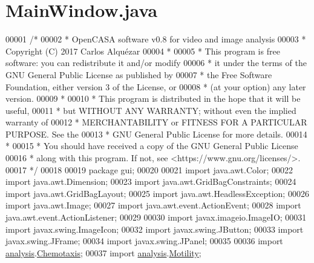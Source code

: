 \hypertarget{_main_window_8java_source}{}\section{Main\+Window.\+java}
\label{_main_window_8java_source}

\begin{DoxyCode}
00001 \textcolor{comment}{/*}
00002 \textcolor{comment}{ *   OpenCASA software v0.8 for video and image analysis}
00003 \textcolor{comment}{ *   Copyright (C) 2017  Carlos Alquézar}
00004 \textcolor{comment}{ *}
00005 \textcolor{comment}{ *   This program is free software: you can redistribute it and/or modify}
00006 \textcolor{comment}{ *   it under the terms of the GNU General Public License as published by}
00007 \textcolor{comment}{ *   the Free Software Foundation, either version 3 of the License, or}
00008 \textcolor{comment}{ *   (at your option) any later version.}
00009 \textcolor{comment}{ *}
00010 \textcolor{comment}{ *   This program is distributed in the hope that it will be useful,}
00011 \textcolor{comment}{ *   but WITHOUT ANY WARRANTY; without even the implied warranty of}
00012 \textcolor{comment}{ *   MERCHANTABILITY or FITNESS FOR A PARTICULAR PURPOSE.  See the}
00013 \textcolor{comment}{ *   GNU General Public License for more details.}
00014 \textcolor{comment}{ *}
00015 \textcolor{comment}{ *   You should have received a copy of the GNU General Public License}
00016 \textcolor{comment}{ *   along with this program.  If not, see <https://www.gnu.org/licenses/>.}
00017 \textcolor{comment}{*/}    
00018 
00019 \textcolor{keyword}{package }gui;
00020 
00021 \textcolor{keyword}{import} java.awt.Color;
00022 \textcolor{keyword}{import} java.awt.Dimension;
00023 \textcolor{keyword}{import} java.awt.GridBagConstraints;
00024 \textcolor{keyword}{import} java.awt.GridBagLayout;
00025 \textcolor{keyword}{import} java.awt.HeadlessException;
00026 \textcolor{keyword}{import} java.awt.Image;
00027 \textcolor{keyword}{import} java.awt.event.ActionEvent;
00028 \textcolor{keyword}{import} java.awt.event.ActionListener;
00029 
00030 \textcolor{keyword}{import} javax.imageio.ImageIO;
00031 \textcolor{keyword}{import} javax.swing.ImageIcon;
00032 \textcolor{keyword}{import} javax.swing.JButton;
00033 \textcolor{keyword}{import} javax.swing.JFrame;
00034 \textcolor{keyword}{import} javax.swing.JPanel;
00035 
00036 \textcolor{keyword}{import} \hyperlink{namespaceanalysis}{analysis}.\hyperlink{classanalysis_1_1_chemotaxis}{Chemotaxis};
00037 \textcolor{keyword}{import} \hyperlink{namespaceanalysis}{analysis}.\hyperlink{classanalysis_1_1_motility}{Motility};

\end{DoxyCode}
